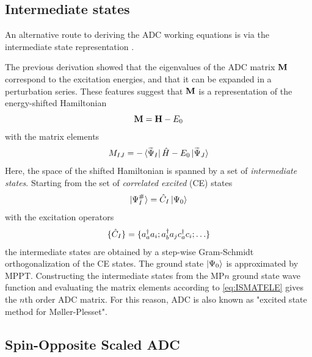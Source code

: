 \subsection{Intermediate states}

An alternative route to deriving the ADC working equations is via the intermediate state representation 
\cite{Sch1991,Sch2004,Kni2012}.

The previous derivation showed that the eigenvalues of the ADC matrix $\mathbf{M}$ correspond to the excitation energies, and that it can be expanded in a perturbation series. These features suggest that $\mathbf{M}$ is a representation of the energy-shifted Hamiltonian
\begin{equation}
\mathbf{M} = \mathbf{H} - E_0
\end{equation}
\noindent with the matrix elements 
\begin{equation}
M_{IJ} = -\bra{\smash{\smash{\widetilde{\Psi}}_I}} \hat{H} - E_0 \ket{\smash{\smash{\widetilde{\Psi}}_J}}
\label{eq:ISMATELE}
\end{equation}
\noindent Here, the space of the shifted Hamiltonian is spanned by a set of \emph{intermediate states}. Starting from the set of \emph{correlated excited} (CE) states
\begin{equation}
\ket{\smash{\Psi^{\#}_I}} = \hat{C}_I \ket{\smash{\Psi_0}} 
\end{equation}
\noindent with the excitation operators
\begin{equation}
\{\hat{C}_I\} = \{ a_a^{\dagger} a_i; a_b^{\dagger} a_j c_a^{\dagger} c_i; \ldots \}
\end{equation}
\noindent the intermediate states are obtained by a step-wise Gram-Schmidt orthogonalization of the CE states. The ground state $\ket{\smash{\Psi_0}}$ is approximated by MPPT. Constructing the intermediate states from the MP$n$ ground state wave function and evaluating the matrix elements according to \ref{eq:ISMATELE} gives the $n$th order ADC matrix. For this reason, ADC is also known as "excited state method for M{\o}ller-Plesset". 

\subsection{Spin-Opposite Scaled ADC \label{sec:SOSADC}}

